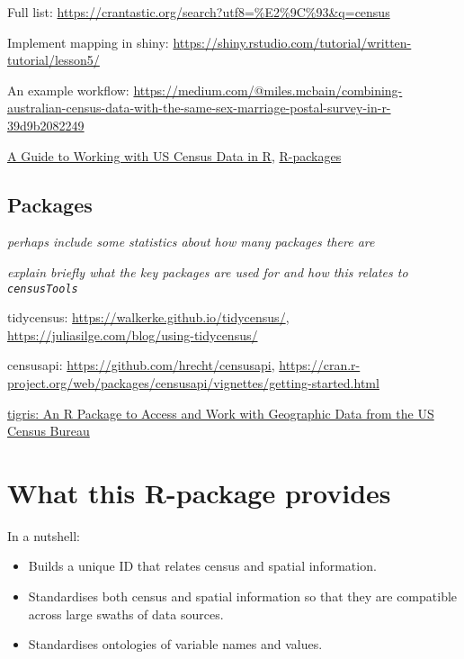 \documentclass[12pt,]{article}
\providecommand{\tightlist}{%
  \setlength{\itemsep}{0pt}\setlength{\parskip}{0pt}}
\begin{document}
Full list: \url{https://crantastic.org/search?utf8=\%E2\%9C\%93\&q=census}

Implement mapping in shiny: \url{https://shiny.rstudio.com/tutorial/written-tutorial/lesson5/}

An example workflow: \url{https://medium.com/@miles.mcbain/combining-australian-census-data-with-the-same-sex-marriage-postal-survey-in-r-39d9b2082249}

\href{https://rconsortium.github.io/censusguide/}{A Guide to Working with US Census Data in R}, \href{https://rconsortium.github.io/censusguide/r-packages-all.html}{R-packages}

\hypertarget{packages}{%
\subsection{Packages}\label{packages}}

\emph{perhaps include some statistics about how many packages there are}

\emph{explain briefly what the key packages are used for and how this relates to \texttt{censusTools}}

tidycensus: \url{https://walkerke.github.io/tidycensus/}, \url{https://juliasilge.com/blog/using-tidycensus/}

censusapi: \url{https://github.com/hrecht/censusapi}, \url{https://cran.r-project.org/web/packages/censusapi/vignettes/getting-started.html}

\href{https://journal.r-project.org/archive/2016/RJ-2016-043/RJ-2016-043.pdf}{tigris: An R Package to Access and Work with Geographic Data from the US Census Bureau}

\hypertarget{what-this-r-package-provides}{%
\section{What this R-package provides}\label{what-this-r-package-provides}}

In a nutshell:

\begin{itemize}
\tightlist
\item
  Builds a unique ID that relates census and spatial information.
\item
  Standardises both census and spatial information so that they are compatible across large swaths of data sources.
\item
  Standardises ontologies of variable names and values.
\end{itemize}
\end{document}
